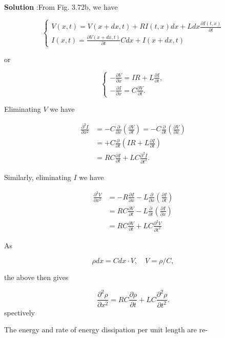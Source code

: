 \documentclass[10pt]{article}
\begin{document}
\textbf{Solution} :From Fig. 3.72b, we have

$$
\left\{\begin{array}{l}
V(x, t)=V(x+d x, t)+R I(t, x) d x+L d x \frac{\partial I(t, x)}{\partial t} \\
I(x, t)=\frac{\partial V(x+d x, t)}{\partial t} C d x+I(x+d x, t)
\end{array}\right.
$$

or

$$
\left\{\begin{array}{l}
-\frac{\partial V}{\partial x}=I R+L \frac{\partial I}{\partial t}, \\
-\frac{\partial I}{\partial x}=C \frac{\partial V}{\partial t} .
\end{array}\right.
$$

Eliminating $V$ we have

$$
\begin{aligned}
\frac{\partial^{2} I}{\partial x^{2}} &=-C \frac{\partial}{\partial x}\left(\frac{\partial V}{\partial t}\right)=-C \frac{\partial}{\partial t}\left(\frac{\partial V}{\partial x}\right) \\
&=+C \frac{\partial}{\partial t}\left(I R+L \frac{\partial I}{\partial t}\right) \\
&=R C \frac{\partial I}{\partial t}+L C \frac{\partial^{2} I}{\partial t^{2}} .
\end{aligned}
$$

 Similarly, eliminating $I$ we have

$$
\begin{aligned}
\frac{\partial^{2} V}{\partial x^{2}} &=-R \frac{\partial I}{\partial x}-L \frac{\partial}{\partial x}\left(\frac{\partial I}{\partial t}\right) \\
&=R C \frac{\partial V}{\partial t}-L \frac{\partial}{\partial t}\left(\frac{\partial I}{\partial x}\right) \\
&=R C \frac{\partial V}{\partial t}+L C \frac{\partial^{2} V}{\partial t^{2}}
\end{aligned}
$$

As

$$
\rho d x=C d x \cdot V, \quad V=\rho / C,
$$

the above then gives

$$
\frac{\partial^{2} \rho}{\partial x^{2}}=R C \frac{\partial \rho}{\partial t}+L C \frac{\partial^{2} \rho}{\partial t^{2}} .
$$
spectively

 The energy and rate of energy dissipation per unit length are re-
\end{document}
